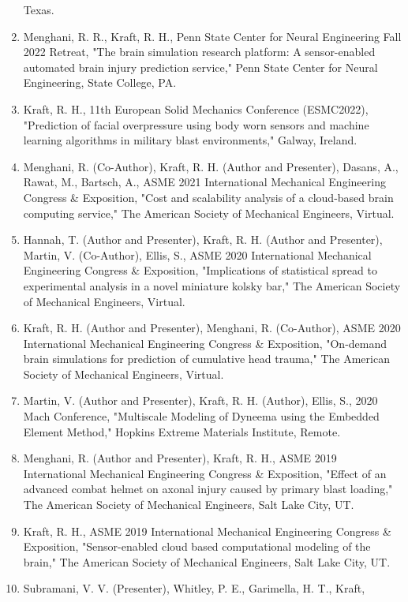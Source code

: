 \documentclass[
]{article}
\begin{document}
\begin{enumerate}
  Texas.
\item
  Menghani, R. R., Kraft, R. H., Penn State Center for Neural
  Engineering Fall 2022 Retreat, "The brain simulation research
  platform: A sensor-enabled automated brain injury prediction service,"
  Penn State Center for Neural Engineering, State College, PA.
\item
  Kraft, R. H., 11th European Solid Mechanics Conference (ESMC2022),
  "Prediction of facial overpressure using body worn sensors and machine
  learning algorithms in military blast environments," Galway, Ireland.
\item
  Menghani, R. (Co-Author), Kraft, R. H. (Author and Presenter), Dasans,
  A., Rawat, M., Bartsch, A., ASME 2021 International Mechanical
  Engineering Congress \& Exposition, "Cost and scalability analysis of
  a cloud-based brain computing service," The American Society of
  Mechanical Engineers, Virtual.
\item
  Hannah, T. (Author and Presenter), Kraft, R. H. (Author and
  Presenter), Martin, V. (Co-Author), Ellis, S., ASME 2020 International
  Mechanical Engineering Congress \& Exposition, "Implications of
  statistical spread to experimental analysis in a novel miniature
  kolsky bar," The American Society of Mechanical Engineers, Virtual.
\item
  Kraft, R. H. (Author and Presenter), Menghani, R. (Co-Author), ASME
  2020 International Mechanical Engineering Congress \& Exposition,
  "On-demand brain simulations for prediction of cumulative head
  trauma," The American Society of Mechanical Engineers, Virtual.
\item
  Martin, V. (Author and Presenter), Kraft, R. H. (Author), Ellis, S.,
  2020 Mach Conference, "Multiscale Modeling of Dyneema using the
  Embedded Element Method," Hopkins Extreme Materials Institute, Remote.
\item
  Menghani, R. (Author and Presenter), Kraft, R. H., ASME 2019
  International Mechanical Engineering Congress \& Exposition, "Effect
  of an advanced combat helmet on axonal injury caused by primary blast
  loading," The American Society of Mechanical Engineers, Salt Lake
  City, UT.
\item
  Kraft, R. H., ASME 2019 International Mechanical Engineering Congress
  \& Exposition, "Sensor-enabled cloud based computational modeling of
  the brain," The American Society of Mechanical Engineers, Salt Lake
  City, UT.
\item
  Subramani, V. V. (Presenter), Whitley, P. E., Garimella, H. T., Kraft,

\end{enumerate}
\end{document}
